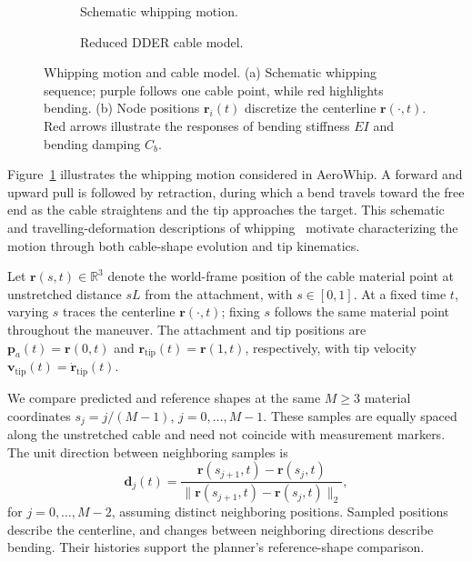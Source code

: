 \documentclass[letterpaper, 10 pt, conference]{ieeeconf}
\begin{document}
\begin{figure}[t]
    \centering
    \begin{subfigure}[t]{0.54\textwidth}
        \centering
        \resizebox{\linewidth}{!}{%
            
        }
        \caption{Schematic whipping motion.}
        \label{fig:problem_whipping}
    \end{subfigure}
    \hfill
    \begin{subfigure}[t]{0.45\textwidth}
        \centering
        \resizebox{\linewidth}{!}{%
            
        }
        \caption{Reduced DDER cable model.}
        \label{fig:problem_dder}
    \end{subfigure}
    \caption{Whipping motion and cable model.
    (a) Schematic whipping sequence; purple follows one cable
    point, while red highlights bending.
    (b) Node positions $\mathbf r_i(t)$ discretize the centerline
    $\mathbf r(\cdot,t)$. Red arrows illustrate the responses of
    bending stiffness $EI$ and bending damping $C_b$.}
    \label{fig:problem_statement}
\end{figure}

Figure~\ref{fig:problem_whipping} illustrates the whipping
motion considered in AeroWhip. A forward and upward pull is
followed by retraction, during which a bend travels toward the
free end as the cable straightens and the tip approaches the target.
This schematic and travelling-deformation descriptions of
whipping~\cite{MCMILLEN2003192} motivate characterizing the
motion through both cable-shape evolution and tip kinematics.

Let $\mathbf r(s,t)\in\mathbb R^3$ denote the world-frame position
of the cable material point at unstretched distance $sL$ from the
attachment, with $s\in[0,1]$. At a fixed time $t$, varying $s$
traces the centerline $\mathbf r(\cdot,t)$; fixing $s$ follows
the same material point throughout the maneuver.
The attachment and tip positions are
$\mathbf p_a(t)=\mathbf r(0,t)$ and
$\mathbf r_{\mathrm{tip}}(t)=\mathbf r(1,t)$, respectively,
with tip velocity
$\mathbf v_{\mathrm{tip}}(t)=\dot{\mathbf r}_{\mathrm{tip}}(t)$.

We compare predicted and reference shapes at the same
$M\geq3$ material coordinates
$s_j=j/(M-1)$, $j=0,\ldots,M-1$.
These samples are equally spaced along the unstretched cable
and need not coincide with measurement markers.
The unit direction between neighboring samples is
\begin{equation}
\mathbf d_j(t)
=
\frac{\mathbf r(s_{j+1},t)-\mathbf r(s_j,t)}
{\|\mathbf r(s_{j+1},t)-\mathbf r(s_j,t)\|_2},
\label{eq:whip_segment_direction}
\end{equation}
for $j=0,\ldots,M-2$, assuming distinct neighboring positions.
Sampled positions describe the centerline, and changes between
neighboring directions describe bending. Their histories support
the planner's reference-shape comparison.
\end{document}
